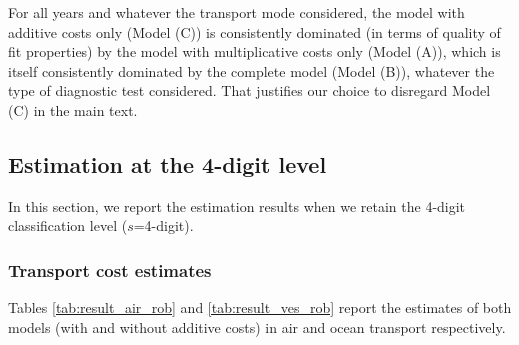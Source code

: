 \documentclass[11pt,twoside, authoryear]{elsarticle}
\begin{document}
For all years and whatever the transport mode considered, the model with additive costs only (Model (C)) is consistently dominated (in terms of quality of fit properties) by the model with multiplicative costs only (Model (A)), which is itself consistently dominated by the complete model (Model (B)), whatever the type of diagnostic test considered. That justifies our choice to disregard Model (C) in the main text.


\subsection{Estimation at the 4-digit level \label{app:4digit}}

In this section, we report the estimation results when we retain the 4-digit classification level ($s$=4-digit).

\subsubsection{Transport cost estimates}


Tables \ref{tab:result_air_rob} and \ref{tab:result_ves_rob} report the estimates of both models (with and without additive costs) in air and ocean transport respectively.
\end{document}

